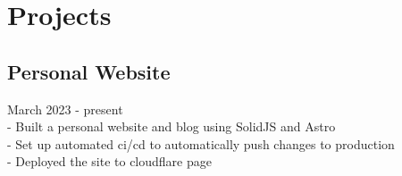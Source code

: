\section{Projects}

\subsection{Personal Website} March 2023 - present \\
\:-\: Built a personal website and blog using SolidJS and Astro \\
\:-\: Set up automated ci/cd to automatically push changes to production \\
\:-\: Deployed the site to cloudflare page \\
